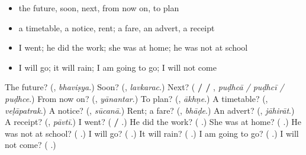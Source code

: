 \begin{itemize}
\raggedright
  \item the future, soon, next, from now on, to plan
  \item a timetable, a notice, rent; a fare, an advert, a receipt
  \item I went; he did the work; she was at home; he was not at school
  \item I will go; it will rain; I am going to go; I will not come
\end{itemize}

\begin{tcolorbox}[breakable,colback=teal!4,colframe=teal!35!black,title={Before you move on}]
The future? (\textbf{}, \emph{bhaviṣya}.) Soon? (\textbf{}, \emph{lavkarac}.) Next? (\textbf{ /  / }, \emph{puḍhcā / puḍhcī / puḍhce}.) From now on? (\textbf{}, \emph{yānantar}.) To plan? (\textbf{}, \emph{ākhṇe}.) A timetable? (\textbf{}, \emph{veḷāpatrak}.) A notice? (\textbf{}, \emph{sūcanā}.) Rent; a fare? (\textbf{}, \emph{bhāḍe}.) An advert? (\textbf{}, \emph{jāhirāt}.) A receipt? (\textbf{}, \emph{pāvtī}.) I went? (\textbf{  / }.) He did the work? (\textbf{  }.) She was at home? (\textbf{  }.) He was not at school? (\textbf{  }.) I will go? (\textbf{ }.) It will rain? (\textbf{ }.) I am going to go? (\textbf{  }.) I will not come? (\textbf{  }.)
\end{tcolorbox}
